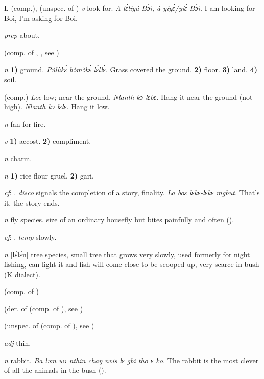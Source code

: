 \begin{letter}{L}
 (comp.), (unspec. of ) \textit{v} look for. \textit{A lɛ́líyá Bɔ̀ì, à yíyɛ́/yíɛ́ Bɔ̀ì.} I am looking for Boi, I'm asking for Boi.

 \textit{prep} about.

 (comp. of , , see ) 

 \textit{n} \textbf{1)} ground. \textit{Pùlùkɛ́ bə̀mə̀kɛ́ lɛ́llɛ̀.} Grass covered the ground. \textbf{2)} floor. \textbf{3)} land. \textbf{4)} soil.

 (comp.) \textit{Loc} low; near the ground. \textit{Nlanth kɔ lɛbɛ.} Hang it near the ground (not high). \textit{Nlanth kɔ lɛlɛ.} Hang it low.

 \textit{n} fan for fire.

 \textit{v} \textbf{1)} accost. \textbf{2)} compliment.

 \textit{n} charm.

 \textit{n} \textbf{1)} rice flour gruel. \textbf{2)} gari.

 \textit{cf}: . \textit{disco} signals the completion of a story, finality. \textit{La boɛ lɛkɛ-lɛkɛ mgbut.} That's it, the story ends.

 \textit{n} fly species, size of an ordinary housefly but bites painfully and often (\citealt{Pichl1967}). 

 \textit{cf}: . \textit{temp} slowly.

 \textit{n} [lɛ̀lɛ̀n] tree species, small tree that grows very slowly, used formerly for night fishing, can light it and fish will come close to be scooped up, very scarce in bush (K dialect). 

 (comp. of ) 

 (der. of  (comp. of ), see ) 

 (unspec. of  (comp. of ), see ) 

 \textit{adj} thin.

 \textit{n} rabbit. \textit{Ba ləm wɔ nthin chaŋ nvis lɛ gbi tho ɛ ko.} The rabbit is the most clever of all the animals in the bush (\citealt{Pichl1967}). 


\end{letter}
